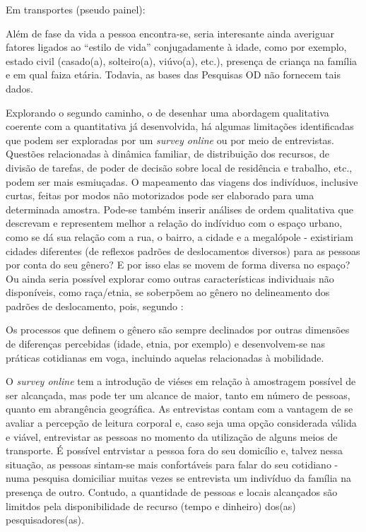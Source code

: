 Em transportes (pseudo painel): \cite{DARGAY1999,DARGAY2002,BRESSON2004}

Além de fase da vida a pessoa encontra-se, seria interesante ainda averiguar fatores ligados ao ``estilo de vida'' conjugadamente à idade, como por exemplo, estado civil (casado(a), solteiro(a), viúvo(a), etc.), presença de criança na família e em qual faiza etária. Todavia, as bases das Pesquisas OD não fornecem tais dados.



Explorando o segundo caminho, o de desenhar uma abordagem qualitativa coerente com a quantitativa já desenvolvida, há algumas limitações identificadas que podem ser exploradas por um \emph{survey online} ou por meio de entrevistas. Questões relacionadas à dinâmica familiar, de distribuição dos recursos, de divisão de tarefas, de poder de decisão sobre local de residência e trabalho, etc., podem ser mais esmiuçadas. O mapeamento das viagens dos indivíduos, inclusive curtas, feitas por modos não motorizados pode ser elaborado para uma determinada amostra. Pode-se também inserir análises de ordem qualitativa que descrevam e representem melhor a relação do indíviduo com o espaço urbano, como se dá sua relação com a rua, o bairro, a cidade e a megalópole - existiriam cidades diferentes (de reflexos padrões de deslocamentos diversos) para as pessoas por conta do seu gênero? E por isso elas se movem de forma diversa no espaço? Ou ainda seria possível explorar como outras características individuais não disponíveis, como raça/etnia, se soberpõem ao gênero no delineamento dos padrões de deslocamento, pois, segundo :

\begin{citacao}
Os processos que definem o gênero são sempre declinados  por outras dimensões de diferenças percebidas (idade, etnia, por exemplo) e desenvolvem-se nas práticas cotidianas em voga, incluindo aquelas relacionadas à mobilidade.
\end{citacao}

O \emph{survey online} tem a introdução de viéses em relação à amostragem possível de ser alcançada, mas pode ter um alcance de maior, tanto em número de pessoas, quanto em abrangência geográfica. 
As entrevistas contam com a vantagem de se avaliar a percepção de leitura corporal e, caso seja uma opção considerada válida e viável, entrevistar as pessoas no momento da utilização de alguns meios de transporte. 
É possível entrvistar a pessoa fora do seu domicílio e, talvez nessa situação, as pessoas sintam-se mais confortáveis para falar do seu cotidiano - numa pesquisa domiciliar muitas vezes se entrevista um indivíduo da família na presença de outro. Contudo, a quantidade de pessoas e locais alcançados são limitdos pela disponibilidade de recurso (tempo e dinheiro) dos(as) pesquisadores(as). 

